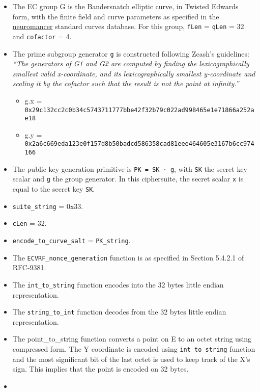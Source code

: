 \documentclass[
]{article}
\providecommand{\tightlist}{%
  \setlength{\itemsep}{0pt}\setlength{\parskip}{0pt}}
\begin{document}
\begin{itemize}
\item
  The EC group G is the Bandersnatch elliptic curve, in Twisted Edwards
  form, with the finite field and curve parameters as specified in the
  \href{https://neuromancer.sk/std/bls/Bandersnatch}{neuromancer}
  standard curves database. For this group, \texttt{fLen} =
  \texttt{qLen} = 32 and \texttt{cofactor} = 4.
\item
  The prime subgroup generator \texttt{g} is constructed following
  Zcash's guidelines: \emph{``The generators of G1 and G2 are computed
  by finding the lexicographically smallest valid x-coordinate, and its
  lexicographically smallest y-coordinate and scaling it by the cofactor
  such that the result is not the point at infinity.''}

  \begin{itemize}
  \tightlist
  \item
    g.x =
    \texttt{0x29c132cc2c0b34c5743711777bbe42f32b79c022ad998465e1e71866a252ae18}
  \item
    g.y =
    \texttt{0x2a6c669eda123e0f157d8b50badcd586358cad81eee464605e3167b6cc974166}
  \end{itemize}
\item
  The public key generation primitive is \texttt{PK\ =\ SK\ ·\ g}, with
  \texttt{SK} the secret key scalar and \texttt{g} the group generator.
  In this ciphersuite, the secret scalar \texttt{x} is equal to the
  secret key \texttt{SK}.
\item
  \texttt{suite\_string} = 0x33.
\item
  \texttt{cLen} = 32.
\item
  \texttt{encode\_to\_curve\_salt} = \texttt{PK\_string}.
\item
  The \texttt{ECVRF\_nonce\_generation} function is as specified in
  Section 5.4.2.1 of RFC-9381.
\item
  The \texttt{int\_to\_string} function encodes into the 32 bytes little
  endian representation.
\item
  The \texttt{string\_to\_int} function decodes from the 32 bytes little
  endian representation.
\item
  The point\_to\_string function converts a point on E to an octet
  string using compressed form. The Y coordinate is encoded using
  \texttt{int\_to\_string} function and the most significant bit of the
  last octet is used to keep track of the X's sign. This implies that
  the point is encoded on 32 bytes.
\item

\end{itemize}
\end{document}
